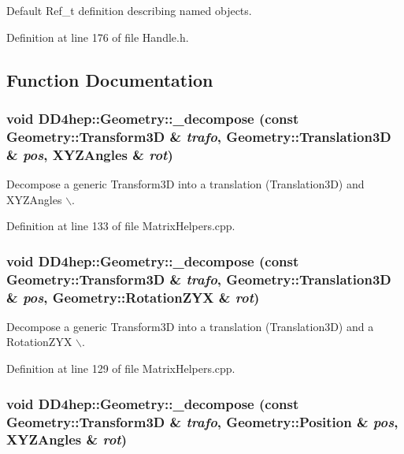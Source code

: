 Default Ref\_\-t definition describing named objects. 

Definition at line 176 of file Handle.h.

\subsection{Function Documentation}
\hypertarget{group___d_d4_h_e_p___g_e_o_m_e_t_r_y_gafde0308d492794fe4b55f66247921482}{
\subsubsection[{\_\-decompose}]{\setlength{\rightskip}{0pt plus 5cm}void DD4hep::Geometry::\_\-decompose (const Geometry::Transform3D \& {\em trafo}, \/  Geometry::Translation3D \& {\em pos}, \/  XYZAngles \& {\em rot})}}
\label{group___d_d4_h_e_p___g_e_o_m_e_t_r_y_gafde0308d492794fe4b55f66247921482}


Decompose a generic Transform3D into a translation (Translation3D) and XYZAngles $\backslash$. 

Definition at line 133 of file MatrixHelpers.cpp.\hypertarget{group___d_d4_h_e_p___g_e_o_m_e_t_r_y_ga46814636f071d07ca4567f3244884664}{
\subsubsection[{\_\-decompose}]{\setlength{\rightskip}{0pt plus 5cm}void DD4hep::Geometry::\_\-decompose (const Geometry::Transform3D \& {\em trafo}, \/  Geometry::Translation3D \& {\em pos}, \/  Geometry::RotationZYX \& {\em rot})}}
\label{group___d_d4_h_e_p___g_e_o_m_e_t_r_y_ga46814636f071d07ca4567f3244884664}


Decompose a generic Transform3D into a translation (Translation3D) and a RotationZYX $\backslash$. 

Definition at line 129 of file MatrixHelpers.cpp.\hypertarget{group___d_d4_h_e_p___g_e_o_m_e_t_r_y_gad0cc5511671f40c3394c8688e7a2316f}{
\subsubsection[{\_\-decompose}]{\setlength{\rightskip}{0pt plus 5cm}void DD4hep::Geometry::\_\-decompose (const Geometry::Transform3D \& {\em trafo}, \/  Geometry::Position \& {\em pos}, \/  XYZAngles \& {\em rot})}}
\label{group___d_d4_h_e_p___g_e_o_m_e_t_r_y_gad0cc5511671f40c3394c8688e7a2316f}


